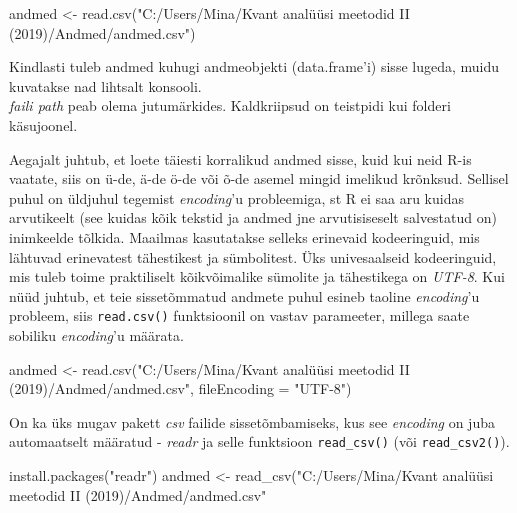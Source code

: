 \documentclass[
]{book}
\newenvironment{Shaded}{\begin{snugshade}}{\end{snugshade}}
\newcommand{\AttributeTok}[1]{\textcolor[rgb]{0.77,0.63,0.00}{#1}}
\newcommand{\FunctionTok}[1]{\textcolor[rgb]{0.00,0.00,0.00}{#1}}
\newcommand{\NormalTok}[1]{#1}
\newcommand{\OtherTok}[1]{\textcolor[rgb]{0.56,0.35,0.01}{#1}}
\newcommand{\StringTok}[1]{\textcolor[rgb]{0.31,0.60,0.02}{#1}}
\begin{document}
\begin{Shaded}
\begin{Highlighting}[]
\NormalTok{andmed }\OtherTok{\textless{}{-}} \FunctionTok{read.csv}\NormalTok{(}\StringTok{"C:/Users/Mina/Kvant analüüsi meetodid II (2019)/Andmed/andmed.csv"}\NormalTok{)}
\end{Highlighting}
\end{Shaded}

Kindlasti tuleb andmed kuhugi andmeobjekti (data.frame'i) sisse lugeda, muidu kuvatakse nad lihtsalt konsooli.\\
\emph{faili path} peab olema jutumärkides. Kaldkriipsud on teistpidi kui folderi käsujoonel.

Aegajalt juhtub, et loete täiesti korralikud andmed sisse, kuid kui neid R-is vaatate, siis on ü-de, ä-de ö-de või õ-de asemel mingid imelikud krõnksud. Sellisel puhul on üldjuhul tegemist \emph{encoding}'u probleemiga, st R ei saa aru kuidas arvutikeelt (see kuidas kõik tekstid ja andmed jne arvutisiseselt salvestatud on) inimkeelde tõlkida. Maailmas kasutatakse selleks erinevaid kodeeringuid, mis lähtuvad erinevatest tähestikest ja sümbolitest. Üks univesaalseid kodeeringuid, mis tuleb toime praktiliselt kõikvõimalike sümolite ja tähestikega on \emph{UTF-8}. Kui nüüd juhtub, et teie sissetõmmatud andmete puhul esineb taoline \emph{encoding}'u probleem, siis \texttt{read.csv()} funktsioonil on vastav parameeter, millega saate sobiliku \emph{encoding}'u määrata.

\begin{Shaded}
\begin{Highlighting}[]
\NormalTok{andmed }\OtherTok{\textless{}{-}} \FunctionTok{read.csv}\NormalTok{(}\StringTok{"C:/Users/Mina/Kvant analüüsi meetodid II (2019)/Andmed/andmed.csv"}\NormalTok{,}
                   \AttributeTok{fileEncoding =} \StringTok{"UTF{-}8"}\NormalTok{)}
\end{Highlighting}
\end{Shaded}

On ka üks mugav pakett \emph{csv} failide sissetõmbamiseks, kus see \emph{encoding} on juba automaatselt määratud - \emph{readr} ja selle funktsioon \texttt{read\_csv()} (või \texttt{read\_csv2()}).

\begin{Shaded}
\begin{Highlighting}[]
\FunctionTok{install.packages}\NormalTok{(}\StringTok{"readr"}\NormalTok{)}
\NormalTok{andmed }\OtherTok{\textless{}{-}} \FunctionTok{read\_csv}\NormalTok{(}\StringTok{"C:/Users/Mina/Kvant analüüsi meetodid II (2019)/Andmed/andmed.csv"}
\end{Highlighting}
\end{Shaded}
\end{document}
